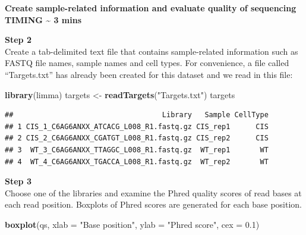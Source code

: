 \documentclass[]{book}
\newenvironment{Shaded}{\begin{snugshade}}{\end{snugshade}}
\newcommand{\DataTypeTok}[1]{\textcolor[rgb]{0.13,0.29,0.53}{#1}}
\newcommand{\DecValTok}[1]{\textcolor[rgb]{0.00,0.00,0.81}{#1}}
\newcommand{\FloatTok}[1]{\textcolor[rgb]{0.00,0.00,0.81}{#1}}
\newcommand{\KeywordTok}[1]{\textcolor[rgb]{0.13,0.29,0.53}{\textbf{#1}}}
\newcommand{\NormalTok}[1]{#1}
\newcommand{\OperatorTok}[1]{\textcolor[rgb]{0.81,0.36,0.00}{\textbf{#1}}}
\newcommand{\StringTok}[1]{\textcolor[rgb]{0.31,0.60,0.02}{#1}}
\begin{document}
\textbf{Create sample-related information and evaluate quality of sequencing TIMING \textasciitilde{} 3 mins}

\textbf{Step 2}\\

Create a tab-delimited text file that contains sample-related information such as FASTQ file names, sample names and cell types. For convenience, a file called ``Targets.txt'' has already been created for this dataset and we read in this file:

\begin{Shaded}
\begin{Highlighting}[]
\KeywordTok{library}\NormalTok{(limma)}
\NormalTok{targets <-}\StringTok{ }\KeywordTok{readTargets}\NormalTok{(}\StringTok{"Targets.txt"}\NormalTok{)}
\NormalTok{targets}
\end{Highlighting}
\end{Shaded}

\begin{verbatim}
##                                   Library   Sample CellType
## 1 CIS_1_C6AG6ANXX_ATCACG_L008_R1.fastq.gz CIS_rep1      CIS
## 2 CIS_2_C6AG6ANXX_CGATGT_L008_R1.fastq.gz CIS_rep2      CIS
## 3  WT_3_C6AG6ANXX_TTAGGC_L008_R1.fastq.gz  WT_rep1       WT
## 4  WT_4_C6AG6ANXX_TGACCA_L008_R1.fastq.gz  WT_rep2       WT
\end{verbatim}

\textbf{Step 3}\\
Choose one of the libraries and examine the Phred quality scores of read bases at each read position. Boxplots of Phred scores are generated for each base position.

\begin{Shaded}
\end{Shaded}

\begin{Shaded}
\begin{Highlighting}[]
\KeywordTok{boxplot}\NormalTok{(qs,}
        \DataTypeTok{xlab =} \StringTok{"Base position"}\NormalTok{,}
        \DataTypeTok{ylab =} \StringTok{"Phred score"}\NormalTok{,}
        \DataTypeTok{cex =} \FloatTok{0.1}\NormalTok{)}
\end{Highlighting}
\end{Shaded}
\end{document}
